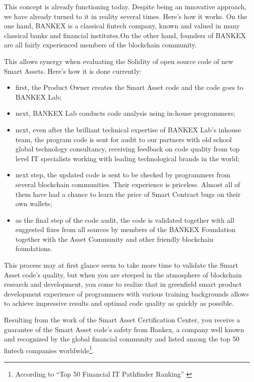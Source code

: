 \documentclass{article}
\begin{document}
\begin{multicols}{2}
This concept is already functioning today. Despite being an innovative approach, we have already turned to it in reality several times. Here's how it works. On the one hand, BANKEX is a classical fintech company, known and valued in many classical banks and financial institutes.On the other hand, founders of BANKEX are all fairly experienced members of the blockchain community. 

This allows synergy when evaluating the Solidity of open source code of new Smart Assets. Here's how it is done currently:

\begin{itemize}
\item first, the Product Owner creates the Smart Asset code and the code goes to BANKEX Lab;
\item next, BANKEX Lab conducts code analysis using in-house programmers;
\item next, even after the brilliant technical expertise of BANKEX Lab's inhouse team, the program code is sent for audit to our partners with old school global technology consultancy, receiving feedback on code quality from top level IT specialists working with leading technological brands in the world; 
\item next step, the updated code is sent to be checked by programmers from several blockchain communities. Their experience is priceless. Almost all of them have had a chance to learn the price of Smart Contract bugs on their own wallets;
\item as the final step of the code audit, the code is validated together with all suggested fixes from all sources by members of the BANKEX Foundation together with the Asset Community and other friendly blockchain foundations.
\end{itemize}

This process may at first glance seem to take more time to validate the Smart Asset code's quality, but when you are steeped in the atmosphere of blockchain research and development, you come to realize that in greenfield smart product development experience of programmers with various training backgrounds allows to achieve impressive results and optimal code quality as quickly as possible.
	
Resulting from the work of the Smart Asset Certification Center, you receive a guarantee of the Smart Asset code's safety from Bankex, a company well known and recognized by the global financial community and listed among the top 50 fintech companies worldwide\footnote{According to \enquote{Top 50 Financial IT Pathfinder Ranking} \cite{top2017}}.


\end{multicols}
\end{document}
